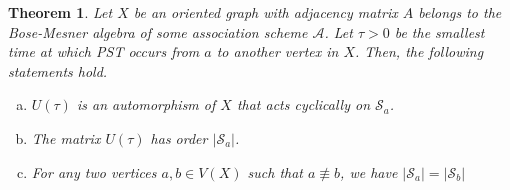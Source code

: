 \documentclass{amsart}
\theoremstyle{plain}
\newtheorem{theorem}{Theorem}[section]
\theoremstyle{remark}\newtheorem{con}[theorem]{Construction}
\theoremstyle{remark} \newtheorem*{remark}{Remark}
\theoremstyle{remark} \newtheorem{example}{Example}
\newcommand{\cS}{\mathcal{S}}
\newcommand{\cA}{\mathcal{A}}
\begin{document}
\begin{theorem}\label{thm:BMalgCyclicP}
    Let $X$ be an oriented graph with adjacency matrix $A$ belongs to the Bose-Mesner algebra of some association scheme $\cA$.
    Let $\tau>0$ be the smallest time at which PST occurs from $a$ to another vertex in $X$.
    Then, the following statements hold.
    \begin{enumerate}[(a)]
    	\item $U(\tau)$ is an automorphism of $X$ that acts cyclically on $\cS_a$. 
    	\item The matrix $U(\tau)$ has order $|\cS_a|$.
    	\item For any two vertices $a,b\in V(X)$ such that $a \not\equiv b$, we have $|\cS_a| = |\cS_b|$
    \end{enumerate}
        
\end{theorem}
\end{document}
